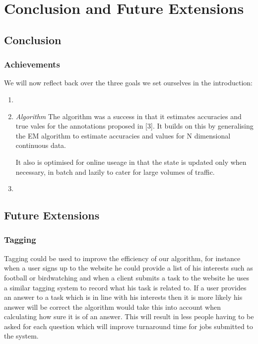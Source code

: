 \documentclass[11pt]{article}
\begin{document}

\section{Conclusion and Future Extensions}

\subsection{Conclusion}
\subsubsection{Achievements}
We will now reflect back over the three goals we set ourselves in the introduction:
\begin{enumerate}
\item

\item \emph{Algorithm}
The algorithm was a success in that it estimates accuracies and true vales for the annotations proposed in [3]. It builds on this by generalising the EM algorithm to estimate accuracies and values for N dimensional continuous data.

It also is optimised for online useage in that the state is updated only when necessary, in batch and lazily to cater for large volumes of traffic.
\item

\end{enumerate}

\subsection{Future Extensions}

\subsubsection{Tagging}
Tagging could be used to improve the efficiency of our algorithm, for instance when a user signs up to the website he could provide a list of his interests such as football or birdwatching and when a client submits a task to the website he uses a similar tagging system to record what his task is related to. If a user provides an answer to a task which is in line with his interests then it is more likely his answer will be correct the algorithm would take this into account when calculating how sure it is of an answer. This will result in less people having to be asked for each question which will improve turnaround time for jobs submitted to the system. 
\end{document}
